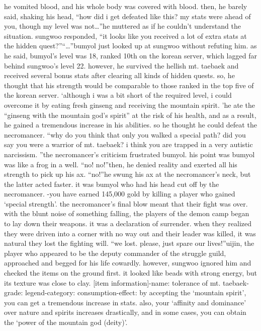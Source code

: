 he vomited blood, and his whole body was covered with blood.
then, he barely said, shaking his head, “how did i get defeated like this? my stats were ahead of you, though my level was not…”he muttered as if he couldn’t understand the situation.
sungwoo responded, “it looks like you received a lot of extra stats at the hidden quest?”“…”bumyol just looked up at sungwoo without refuting him.
 as he said, bumyol’s level was 18, ranked 10th on the korean server, which lagged far behind sungwoo’s level 22.
however, he survived the hellish mt.
 taebaek and received several bonus stats after clearing all kinds of hidden quests.
 so, he thought that his strength would be comparable to those ranked in the top five of the korean server.
‘although i was a bit short of the required level, i could overcome it by eating fresh ginseng and receiving the mountain spirit.
’he ate the “ginseng with the mountain god’s spirit” at the risk of his health, and as a result, he gained a tremendous increase in his abilities.
so he thought he could defeat the necromancer.
“why do you think that only you walked a special path? did you say you were a warrior of mt.
 taebaek? i think you are trapped in a very autistic narcissism.
”the necromancer’s criticism frustrated bumyol.
 his point was bumyol was like a frog in a well.
“no! no!”then, he denied reality and exerted all his strength to pick up his ax.
“no!”he swung his ax at the necromancer’s neck, but the latter acted faster.
it was bumyol who had his head cut off by the necromancer.
-you have earned 145,000 gold by killing a player who gained ‘special strength’.
the necromancer’s final blow meant that their fight was over.
with the blunt noise of something falling, the players of the demon camp began to lay down their weapons.
 it was a declaration of surrender.
when they realized they were driven into a corner with no way out and their leader was killed, it was natural they lost the fighting will.
“we lost.
 please, just spare our lives!”uijin, the player who appeared to be the deputy commander of the struggle guild, approached and begged for his life cowardly.
 however, sungwoo ignored him and checked the items on the ground first.
it looked like beads with strong energy, but its texture was close to clay.
[item information]-name: tolerance of mt.
 taebaek-grade: legend-category: consumption-effect: by accepting the ‘mountain spirit’, you can get a tremendous increase in stats.
 also, your ‘affinity and dominance’ over nature and spirits increases drastically, and in some cases, you can obtain the ‘power of the mountain god (deity)’.

